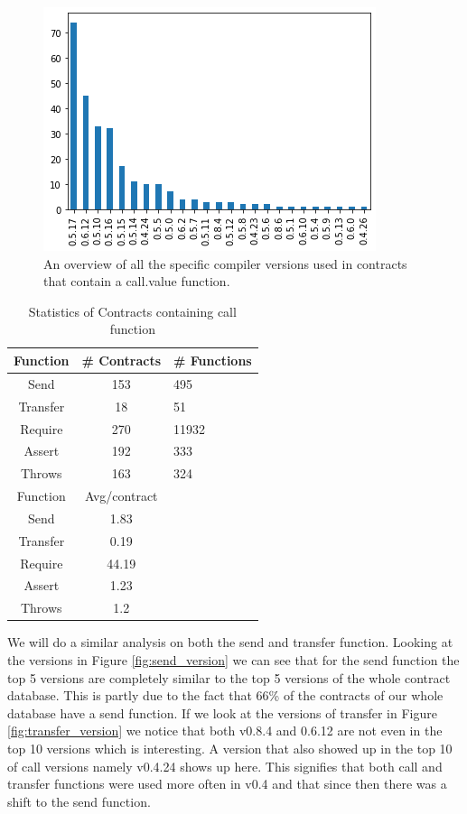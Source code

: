 \documentclass[10pt,conference]{IEEEtran}
\begin{document}
\begin{figure}[h]
  \centering
  \includegraphics[width=\linewidth]{img/versions_call_v3_total.png}
  \caption{An overview of all the specific compiler versions used in contracts that contain a call.value function. }
  \label{fig:call_version}
\end{figure}

\begin{table}
  \caption{Statistics of Contracts containing call function}
  \label{tab:call}
  \begin{tabular}{ccl}
    \hline
    Function & \# Contracts & \# Functions\\
    \hline
    Send&153&495\\
    Transfer&18&51\\
    Require&270&11932\\
    Assert&192&333\\
    Throws&163&324\\
    \hline
    Function & Avg/contract\\
    \hline
    Send&1.83\\
    Transfer&0.19\\
    Require&44.19\\
    Assert&1.23\\
    Throws&1.2\\
  \hline
\end{tabular}
\end{table}

We will do a similar analysis on both the send and transfer function. Looking at the versions in Figure \ref{fig:send_version} we can see that for the send function the top 5 versions are completely similar to the top 5 versions of the whole contract database. This is partly due to the fact that 66\% of the contracts of our whole database have a send function. If we look at the versions of transfer in Figure \ref{fig:transfer_version} we notice that both v0.8.4 and 0.6.12 are not even in the top 10 versions which is interesting. A version that also showed up in the top 10 of call versions namely v0.4.24 shows up here. This signifies that both call and transfer functions were used more often in v0.4 and that since then there was a shift to the send function. 
\end{document}
